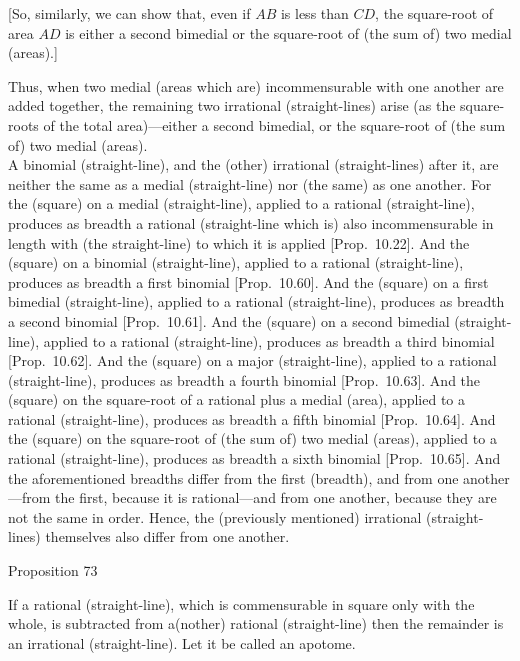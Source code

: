 \mbox{[}So, similarly, we can show that, even if $AB$ is less than $CD$, the
square-root of area $AD$ is either a second bimedial or the square-root
of (the sum of) two medial (areas).]

Thus, when two medial (areas which are) incommensurable with one another are added together, the remaining
two irrational (straight-lines) arise (as the square-roots of the total area)---either a second bimedial, or the square-root of (the sum of)
two medial (areas).\\

A binomial (straight-line), and the (other) irrational (straight-lines) 
after it, are neither the same as a medial (straight-line) nor (the same) as one another.
For the (square) on a medial (straight-line), applied to a rational (straight-line),
produces as breadth a rational (straight-line which is) also incommensurable
in length with (the straight-line) to which it is applied [Prop.~10.22]. And the (square) on a binomial
(straight-line), applied to a rational (straight-line), produces
as breadth a first binomial [Prop.~10.60]. 
And the (square) on a first bimedial (straight-line), applied
to a rational (straight-line), produces as breadth a  second binomial
[Prop.~10.61]. And the (square) on a second bimedial (straight-line), applied
to a rational (straight-line), produces as breadth a  third binomial
[Prop.~10.62]. And the (square) on a major (straight-line), applied
to a rational (straight-line), produces as breadth a  fourth binomial
[Prop.~10.63].  And the (square) on the square-root of a rational plus a medial (area), applied
to a rational (straight-line), produces as breadth a  fifth binomial
[Prop.~10.64]. And the (square) on the square-root of (the sum of) two medial (areas), applied
to a rational (straight-line), produces as breadth a  sixth binomial
[Prop.~10.65]. And the aforementioned breadths
differ from the first (breadth), and from one another---from the first, because it is rational---and from one another, because they are not the same in order. Hence, the (previously mentioned) irrational (straight-lines) themselves
also differ from one another.


\begin{center}
{\large Proposition 73}
\end{center}

If  a  rational (straight-line), which is commensurable in square only with the
whole, is subtracted from a(nother) rational (straight-line)  then the remainder is an irrational (straight-line). Let it be called an apotome.

